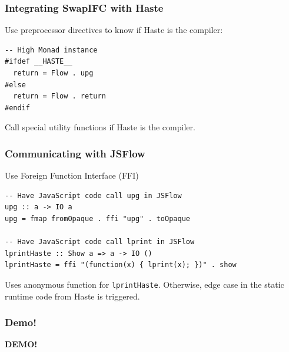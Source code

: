 \documentclass{beamer}
\begin{document}

\begin{frame}[fragile]
  \frametitle{Integrating SwapIFC with Haste}
  Use preprocessor directives to know if Haste is the compiler:
  \begin{block}{}
\begin{verbatim}
-- High Monad instance
#ifdef __HASTE__
  return = Flow . upg
#else
  return = Flow . return
#endif
\end{verbatim}
  \end{block}
  \pause
  Call special utility functions if Haste is the compiler.
\end{frame}


\begin{frame}[fragile]
  \frametitle{Communicating with JSFlow}
  Use Foreign Function Interface (FFI)
  \begin{block}{}
\begin{verbatim}
-- Have JavaScript code call upg in JSFlow
upg :: a -> IO a
upg = fmap fromOpaque . ffi "upg" . toOpaque

-- Have JavaScript code call lprint in JSFlow
lprintHaste :: Show a => a -> IO ()
lprintHaste = ffi "(function(x) { lprint(x); })" . show
\end{verbatim}
  \end{block}
  \pause
  Uses anonymous function for {\tt lprintHaste}. Otherwise, edge case in the static runtime code from Haste is triggered.
\end{frame}


\begin{frame}
  \frametitle{Demo!}
  \centering
  \Huge \textbf{DEMO!}
\end{frame}

\end{document}
